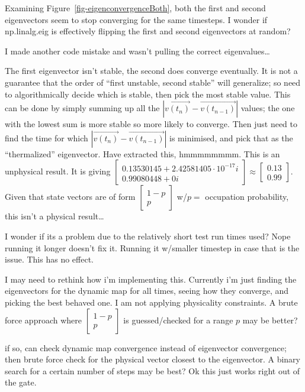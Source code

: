 \documentclass[
  letterpaper,
  DIV=11,
  numbers=noendperiod]{scrartcl}
\begin{document}
Examining Figure~\ref{fig-eigenconvergenceBoth}, both the first and
second eigenvectors seem to stop converging for the same timesteps. I
wonder if np.linalg.eig is effectively flipping the first and second
eigenvectors at random?

I made another code mistake and wasn't pulling the correct
eigenvalues\ldots{}

The first eigenvector isn't stable, the second does converge eventually.
It is not a guarantee that the order of ``first unstable, second
stable'' will generalize; so need to algorithmically decide which is
stable, then pick the most stable value. This can be done by simply
summing up all the \(|\vec{v(t_{n})}-\vec{v(t_{n-1})}|\) values; the one
with the lowest sum is more stable so more likely to converge. Then just
need to find the time for which \(|\vec{v(t_{n})}-\vec{v(t_{n-1})}|\) is
minimised, and pick that as the ``thermalized'' eigenvector. Have
extracted this, hmmmmmmmm. This is an unphysical result. It is giving
\(\begin{bmatrix}0.13530145+2.42581405\cdot10^{-17}i \\ 0.99080448+0i \end{bmatrix}\approx\begin{bmatrix}0.13 \\ 0.99\end{bmatrix}\).
Given that state vectors are of form
\(\begin{bmatrix}1-p \\ p\end{bmatrix}\) w/\(p=\) occupation
probability, this isn't a physical result\ldots{}

I wonder if its a problem due to the relatively short test run times
used? Nope running it longer doesn't fix it. Running it w/smaller
timestep in case that is the issue. This has no effect.

I may need to rethink how i'm implementing this. Currently i'm just
finding the eigenvectors for the dynamic map for all times, seeing how
they converge, and picking the best behaved one. I am not applying
physicality constraints. A brute force approach where
\(\begin{bmatrix}1-p \\ p\end{bmatrix}\) is guessed/checked for a range
\(p\) may be better?

if so, can check dynamic map convergence instead of eigenvector
convergence; then brute force check for the physical vector closest to
the eigenvector. A binary search for a certain number of steps may be
best? Ok this just works right out of the gate.
\end{document}
